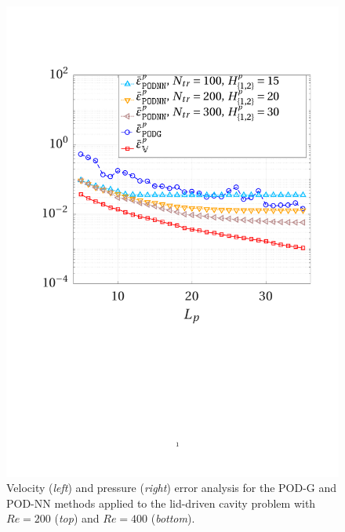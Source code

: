 \documentclass[longtitle]{elsarticle}
\numberwithin{equation}{section}
\theoremstyle{theorem}
\theoremstyle{definition}
\theoremstyle{remark}
\theoremstyle{proposition}
\numberwithin{figure}{section}
\begin{document}
\begin{figure}[t!]
			\includegraphics[scale = 0.37, trim = {2cm 9cm 1.5cm 3.5cm}, clip]{dc_400_p_error_vs_rank_ter}
			
			\vspace*{-0.3cm}

			\caption{Velocity (\emph{left}) and pressure (\emph{right}) error analysis for the POD-G and POD-NN methods applied to the lid-driven cavity problem with $Re = 200$ (\emph{top}) and $Re = 400$ (\emph{bottom}).}
			\label{fig:dc-error-vs-rank}
		\end{figure}
\end{document}
